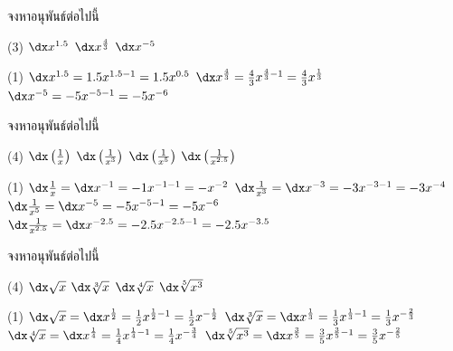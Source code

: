 \begin{frame}[t]
\begin{ex}
จงหาอนุพันธ์ต่อไปนี้
\begin{tasks}(3)
\task $\dx x^{1.5}$
\task $\dx x^{\frac{4}{3}}$
\task $\dx x^{-5}$
\end{tasks}
\end{ex}
\begin{sol}
\begin{tasks}(1)
\task $\dx x^{1.5} = 1.5 x^{1.5 - 1} = 1.5 x^{0.5}$
\task $\dx x^{\frac{4}{3}} = \frac{4}{3} x^{\frac{4}{3} - 1} = \frac{4}{3} x^{\frac{1}{3}}$
\task $\dx x^{-5} = -5 x^{-5-1} = -5x^{-6}$
\end{tasks}
\end{sol}
\end{frame}

\begin{frame}[t]
\begin{ex}
จงหาอนุพันธ์ต่อไปนี้
\begin{tasks}(4)
\task $\dx \left(\frac{1}{x}\right)$
\task $\dx \left(\frac{1}{x^3}\right)$
\task $\dx \left(\frac{1}{x^5}\right)$
\task $\dx \left(\frac{1}{x^{2.5}}\right)$
\end{tasks}
\end{ex}
\begin{sol}
\begin{tasks}(1)
\task $\dx \frac{1}{x} = \dx x^{-1} = -1x^{-1-1} = -x^{-2}$
\task $\dx \frac{1}{x^3} = \dx x^{-3} = -3x^{-3-1} = -3x^{-4}$
\task $\dx \frac{1}{x^5} = \dx x^{-5} = -5x^{-5-1} = -5x^{-6}$
\task $\dx \frac{1}{x^{2.5}} = \dx x^{-2.5} = -2.5x^{-2.5-1} = -2.5x^{-3.5}$
\end{tasks}
\end{sol}
\end{frame}

\begin{frame}[t]
\begin{ex}
จงหาอนุพันธ์ต่อไปนี้
\begin{tasks}(4)
\task $\dx \sqrt{x}$
\task $\dx \sqrt[3]{x}$
\task $\dx \sqrt[4]{x}$
\task $\dx \sqrt[5]{x^3}$
\end{tasks}
\end{ex}
\begin{sol}
\begin{tasks}(1)
\task $\dx \sqrt{x} = \dx x^{\frac{1}{2}} = \frac{1}{2} x^{\frac{1}{2} -1 } = \frac{1}{2} x^{-\frac{1}{2}}$
\task $\dx \sqrt[3]{x} = \dx x^{\frac{1}{3}} = \frac{1}{3} x^{\frac{1}{3} -1 } = \frac{1}{3} x^{-\frac{2}{3}}$
\task $\dx \sqrt[4]{x} = \dx x^{\frac{1}{4}} = \frac{1}{4} x^{\frac{1}{4} -1 } = \frac{1}{4} x^{-\frac{3}{4}}$
\task $\dx \sqrt[5]{x^3} = \dx x^{\frac{3}{5}} = \frac{3}{5} x^{\frac{3}{5} -1 } = \frac{3}{5} x^{-\frac{2}{5}}$
\end{tasks}
\end{sol}
\end{frame}


